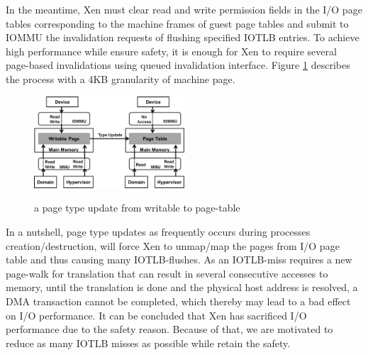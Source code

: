 In the meantime, Xen must clear read and write permission fields in the I/O page tables corresponding to the machine frames of guest page tables and submit to IOMMU the invalidation requests of flushing specified IOTLB entries. To achieve high performance while ensure safety, it is enough for Xen to require several page-based invalidations using queued invalidation interface. Figure \ref{fig:wr2pt} describes the process with a 4KB granularity of machine page.

\begin{figure}[ht]
\centering
\includegraphics[width=0.5\textwidth]{image/translation/wr2pt.png} \\
\caption{a page type update from writable to page-table}
\label{fig:wr2pt}
\end{figure}

In a nutshell, page type updates as frequently occurs during processes creation/destruction, will force Xen to unmap/map the pages from I/O page table and thus causing many IOTLB-flushes. As an IOTLB-miss requires a new page-walk for translation that can result in several consecutive accesses to memory, until the translation is done and the physical host address is resolved, a DMA transaction cannot be completed, which thereby may lead to a bad effect on I/O performance. It can be concluded that Xen has sacrificed I/O performance due to the safety reason. Because of that, we are motivated to reduce as many IOTLB misses as possible while retain the safety.
